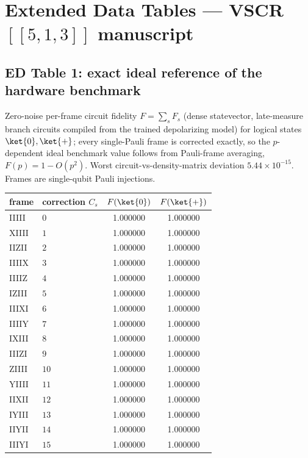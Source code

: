 \documentclass[10pt,a4paper]{article}
\begin{document}
\section*{Extended Data Tables --- VSCR $[\![5,1,3]\!]$ manuscript}

\subsection*{ED Table 1: exact ideal reference of the hardware benchmark}
Zero-noise per-frame circuit fidelity $F=\sum_s F_s$ (dense statevector,
late-measure branch circuits compiled from the trained depolarizing model)
for logical states $\ket{0},\ket{+}$; every single-Pauli frame is corrected
exactly, so the $p$-dependent ideal benchmark value follows from Pauli-frame
averaging, $F(p)=1-O(p^2)$. Worst circuit-vs-density-matrix deviation
$5.44\times 10^{-15}$. Frames are single-qubit Pauli injections.
\begin{longtable}{llcc}
\toprule frame & correction $C_s$ & $F(\ket{0})$ & $F(\ket{+})$ \\ \midrule
IIIII & $0$ & 1.000000 & 1.000000 \\
XIIII & $1$ & 1.000000 & 1.000000 \\
IIZII & $2$ & 1.000000 & 1.000000 \\
IIIIX & $3$ & 1.000000 & 1.000000 \\
IIIIZ & $4$ & 1.000000 & 1.000000 \\
IZIII & $5$ & 1.000000 & 1.000000 \\
IIIXI & $6$ & 1.000000 & 1.000000 \\
IIIIY & $7$ & 1.000000 & 1.000000 \\
IXIII & $8$ & 1.000000 & 1.000000 \\
IIIZI & $9$ & 1.000000 & 1.000000 \\
ZIIII & $10$ & 1.000000 & 1.000000 \\
YIIII & $11$ & 1.000000 & 1.000000 \\
IIXII & $12$ & 1.000000 & 1.000000 \\
IYIII & $13$ & 1.000000 & 1.000000 \\
IIYII & $14$ & 1.000000 & 1.000000 \\
IIIYI & $15$ & 1.000000 & 1.000000 \\
\bottomrule\end{longtable}
\end{document}
